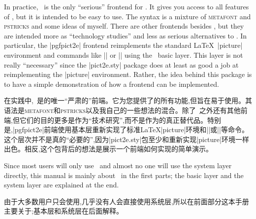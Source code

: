 In practice, \tikzname\ is the only ``serious'' frontend for \pgfname. It gives
you access to all features of \pgfname, but it is intended to be easy to use.
The syntax is a mixture of \textsc{metafont} and \textsc{pstricks} and some
ideas of myself. There are other frontends besides \tikzname, but they are intended
more as ``technology studies'' and less as serious alternatives to
\tikzname. In particular, the |pgfpict2e| frontend   reimplements the standard
\LaTeX\ |{picture}|  environment and commands like |\line| or |\vector| using
the \pgfname\ basic layer. This layer is not really ``necessary'' since the
|pict2e.sty| package does at least as good a job at reimplementing the
|{picture}| environment. Rather, the idea behind this package is to have a
simple demonstration of how a frontend can be implemented.

在实践中,\tikzname\ 是\pgfname 的唯一“严肃的”前端。它为您提供了\pgfname 的所有功能,但旨在易于使用。其语法是\textsc{metafont}和\textsc{pstricks}以及我自己的一些想法的混合。除了\tikzname\ 之外还有其他前端,但它们的目的更多是作为“技术研究”,而不是作为\tikzname 的真正替代品。特别是,|pgfpict2e|前端使用\pgfname 基本层重新实现了标准\LaTeX|{picture}|环境和|\line|或|\vector|等命令。这个层次并不是真的“必要的”,因为|pict2e.sty|包至少和重新实现|{picture}|环境一样出色。相反,这个包背后的想法是展示一个前端如何实现的简单演示。




Since most users will only use \tikzname\ and almost no one will use the system
layer directly, this manual is mainly about \tikzname\ in the first parts; the
basic layer and the system layer are explained at the end.

由于大多数用户只会使用\tikzname ,几乎没有人会直接使用系统层,所以在前面部分这本手册主要关于\tikzname ;基本层和系统层在后面解释。





